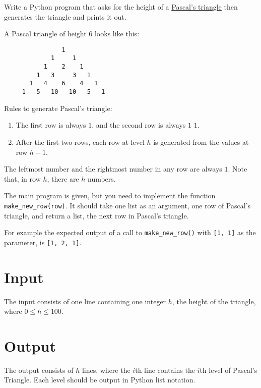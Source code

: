 
Write a Python program that asks for the height of a
\href{https://en.wikipedia.org/wiki/Pascal's\_triangle}{Pascal's triangle}
then generates the triangle and prints it out.

A Pascal triangle of height $6$ looks like this:
\begin{verbatim}
                1
             1     1
           1    2    1
         1   3     3   1
       1   4    6    4   1
     1   5   10   10   5   1
\end{verbatim}
Rules to generate Pascal's triangle:
\begin{enumerate}
    \item The first row is always $1$, and the second row is always $1$ $1$.
    \item After the first two rows, each row at level $h$ is generated from the values at row $h-1$.
\end{enumerate}
The leftmost number and the rightmost number in any row are always $1$.
Note that, in row $h$, there are $h$ numbers.

The main program is given, but you need to implement the function \texttt{make\_new\_row(row)}.
It should take one list as an argument, one row of Pascal's triangle,
and return a list, the next row in Pascal's triangle.

For example the expected output of a call to \texttt{make\_new\_row()}
with \texttt{[1, 1]} as the parameter,
is \texttt{[1, 2, 1]}.

\section*{Input}

The input consists of one line containing one integer $h$, the height of the triangle, where $0 \leq h \leq 100$.

\section*{Output}

The output consists of $h$ lines, where the $i$th line contains the $i$th level of Pascal's Triangle.
Each level should be output in Python list notation.
